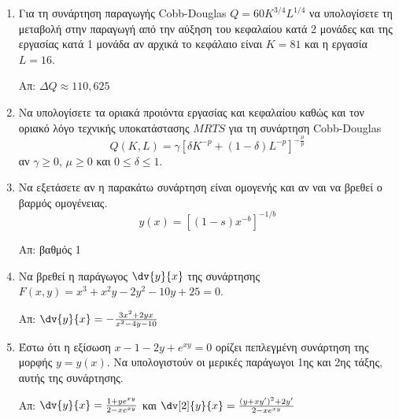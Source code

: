 


\pagestyle{vangelis}





\begin{center}
  \textcolor{Col1}{}
\end{center}

\vspace{\baselineskip}

\begin{enumerate}

  \item Για τη συνάρτηση παραγωγής \textlatin{Cobb-Douglas} $ Q=60K^{3/4}L^{1/4} $ να
    υπολογίσετε τη μεταβολή στην παραγωγή από την αύξηση του κεφαλαίου κατά 2 μονάδες και
    της εργασίας κατά 1 μονάδα αν αρχικά το κεφάλαιο είναι $ K=81 $ και η εργασία 
    $ L=16 $.

    \hfill Απ: $ \Delta Q \approx 110,625 $ 

  \item Να υπολογίσετε τα οριακά προιόντα εργασίας και κεφαλαίου καθώς και τον οριακό 
    λόγο τεχνικής υποκατάστασης $ MRTS $ για τη συνάρτηση \textlatin{Cobb-Douglas} 
    \[
      Q(K,L) = \gamma [\delta K^{-p} + (1- \delta)L^{-p}]^{- \frac{\mu}{p}}
    \] 
    αν $ \gamma \geq 0 $, $ \mu \geq 0 $ και $ 0 \leq \delta \leq 1 $.

  \item Να εξετάσετε αν η παρακάτω συνάρτηση είναι ομογενής και αν ναι να βρεθεί ο βαρμός
    ομογένειας. 
    \[
      y(x) = [(1-s)x^{-b}]^{-1/b} 
    \] 

    \hfill Απ: βαθμός 1 

  \item Να βρεθεί η παράγωγος $ \dv{y}{x} $ της συνάρτησης $ F(x,y) =
    x^{3}+x^{2}y-2y^{2}-10y+25=0 $. 

    \hfill Απ: $ \dv{y}{x} = - \frac{3x^{2}+2yx}{x^{2}-4y-10} $ 

  \item Έστω ότι η εξίσωση $ x-1-2y+e^{xy} = 0 $ ορίζει πεπλεγμένη συνάρτηση της 
    μορφής $ y = y(x) $. Να υπολογιστούν οι μερικές παράγωγοι 
    1ης και 2ης τάξης, αυτής της συνάρτησης.

    \hfill Απ: $ \dv{y}{x} = \frac{1+ye^{xy}}{2-xe^{xy}} $ και $ \dv[2]{y}{x}
    = \frac{(y+xy')^{2}+2y'}{2-xe^{xy}} $ 


\end{enumerate}
